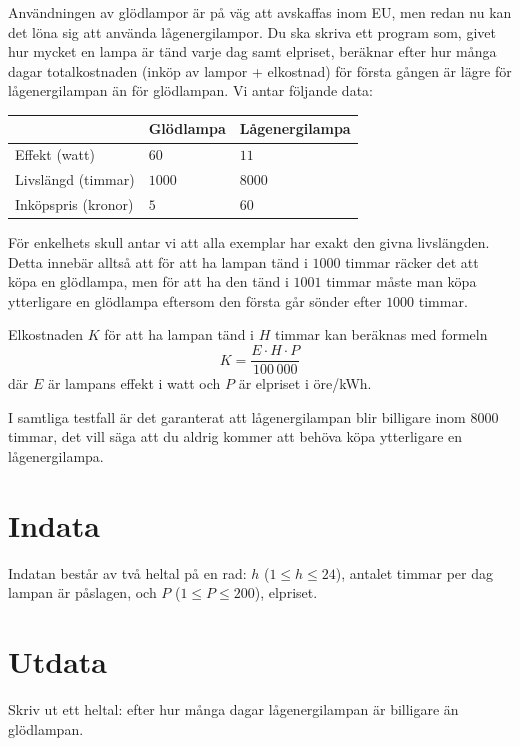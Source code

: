 Användningen av glödlampor är på väg att avskaffas inom EU, men redan nu kan det löna sig att använda lågenergilampor.
Du ska skriva ett program som, givet hur mycket en lampa är tänd varje dag samt elpriset, beräknar efter hur många dagar totalkostnaden (inköp av lampor + elkostnad) för första gången är lägre för lågenergilampan än för glödlampan.
Vi antar följande data:

\begin{center}
\begin{tabular}{|l|l|l|}
\hline
& Glödlampa & Lågenergilampa \\ \hline
Effekt (watt)           & $60$                & $11$             \\ \hline
Livslängd (timmar)           & $1000$              & $8000$           \\ \hline
Inköpspris (kronor) & $5$                 & $60$             \\ \hline
\end{tabular}
\end{center}

För enkelhets skull antar vi att alla exemplar har exakt den givna livslängden.
Detta innebär alltså att för att ha lampan tänd i $1000$ timmar räcker det att köpa en glödlampa, men för att ha den tänd i $1001$ timmar måste man köpa ytterligare en glödlampa eftersom den första går sönder efter $1000$ timmar.

Elkostnaden $K$ för att ha lampan tänd i $H$ timmar kan beräknas med formeln
$$ K = \frac{E \cdot H \cdot P}{100\,000} $$
där $E$ är lampans effekt i watt och $P$ är elpriset i öre/kWh.

I samtliga testfall är det garanterat att lågenergilampan blir billigare inom $8000$ timmar, det vill säga att du aldrig kommer att behöva köpa ytterligare en lågenergilampa.

\section*{Indata}
Indatan består av två heltal på en rad: $h$ ($1 \le h \le 24$), antalet timmar per dag lampan är påslagen, och $P$ ($1 \le P \le 200$), elpriset.

\section*{Utdata}
Skriv ut ett heltal: efter hur många dagar lågenergilampan är billigare än glödlampan.

